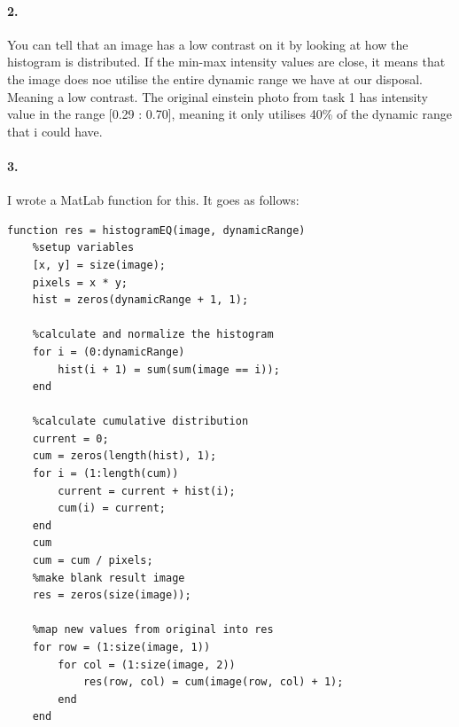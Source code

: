 \documentclass{article}
\begin{document}
\paragraph{2.}
You can tell that an image has a low contrast on it by looking at how the histogram is distributed. If the min-max intensity values are close, it means that the image does noe utilise the entire dynamic range we have at our disposal. Meaning a low contrast. The original einstein photo from task 1 has intensity value in the range [0.29 : 0.70], meaning it only utilises 40\% of the dynamic range that i could have.

\paragraph{3.}
I wrote a MatLab function for this. It goes as follows:
\begin{lstlisting}
function res = histogramEQ(image, dynamicRange)
    %setup variables
    [x, y] = size(image);
    pixels = x * y;
    hist = zeros(dynamicRange + 1, 1);
    
    %calculate and normalize the histogram
    for i = (0:dynamicRange)
        hist(i + 1) = sum(sum(image == i));
    end
    
    %calculate cumulative distribution
    current = 0;
    cum = zeros(length(hist), 1);
    for i = (1:length(cum))
        current = current + hist(i);
        cum(i) = current;
    end
    cum
    cum = cum / pixels;
    %make blank result image
    res = zeros(size(image));
    
    %map new values from original into res
    for row = (1:size(image, 1))
        for col = (1:size(image, 2))
            res(row, col) = cum(image(row, col) + 1);
        end
    end
\end{lstlisting}

\newpage
\end{document}
